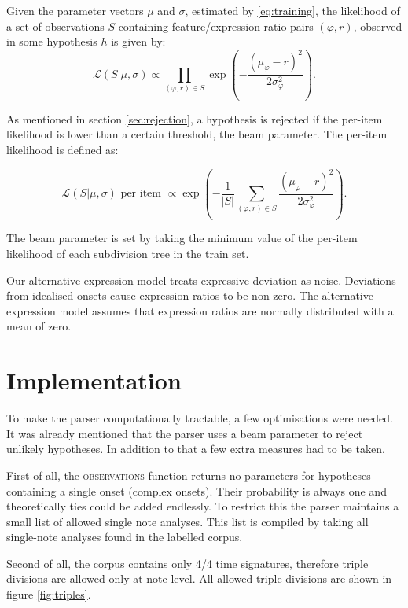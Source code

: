 Given the parameter vectors $\mu$ and $\sigma$, estimated by \ref{eq:training}, the likelihood of a set of observations $S$ containing feature/expression ratio pairs $(\varphi, r)$, observed in some hypothesis $h$ is given by:
\begin{equation}
\label{eq:h_likelihood}
\mathcal{L}(S|\mu, \sigma) \propto \prod_{(\varphi, r) \in S} \exp\left(-\frac{(\mu_\varphi - r)^2}{2\sigma_\varphi^2}\right).
\end{equation}

As mentioned in section \ref{sec:rejection}, a hypothesis is rejected if the per-item likelihood is lower than a certain threshold, the beam parameter. The per-item likelihood is defined as:

\begin{equation}
\label{eq:per_obs_likelihood}
\mathcal{L}(S| \mu, \sigma) \mbox{ per item } \propto \exp\left(-\frac{1}{|S|}\sum_{(\varphi, r) \in S} \frac{(\mu_\varphi - r)^2}{2\sigma_\varphi^2}\right).
\end{equation}

The beam parameter is set by taking the minimum value of the per-item likelihood of each subdivision tree in the train set. 

Our alternative expression model treats expressive deviation as noise. Deviations from idealised onsets cause expression ratios to be non-zero. The alternative expression model assumes that expression ratios are normally distributed with a mean of zero. 

\section{Implementation}
\label{sec:implementation}

To make the parser computationally tractable, a few optimisations were needed. It was already mentioned that the parser uses a beam parameter to reject unlikely hypotheses. In addition to that a few extra measures had to be taken.

First of all, the \textsc{observations} function returns no parameters for hypotheses containing a single onset (complex onsets). Their probability is always one and theoretically ties could be added endlessly. To restrict this the parser maintains a small list of allowed single note analyses. This list is compiled by taking all single-note analyses found in the labelled corpus.

Second of all, the corpus contains only 4/4 time signatures, therefore triple divisions are allowed only at note level. All allowed triple divisions are shown in figure \ref{fig:triples}. 

